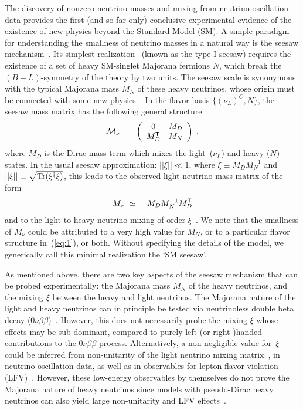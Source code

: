 \documentclass[reprint,prl,twocolumn,superscriptaddress,showpacs,nofootinbib,floatfix,preprintnumbers]{revtex4-1}
\newcommand{\col}{\textcolor{blue}}
\begin{document}
The discovery  of nonzero neutrino  masses and mixing  from neutrino
oscillation  data provides  the  first (and  so  far only)  conclusive
experimental  evidence of  the  existence of  new  physics beyond  the
Standard Model (SM). A simple paradigm for understanding the smallness
of   neutrino    masses   in   a    natural   way   is    the   seesaw
mechanism~\cite{review1}.    Its   simplest   realization~\cite{type1}
(known as the type-I seesaw) requires  the existence of a set of heavy
SM-singlet   Majorana  fermions   $N$,   which   break  the
$(B-L)$-symmetry  of the  theory by  two  units. The  seesaw scale  is
synonymous with  the typical Majorana mass  $M_N$ of these heavy 
neutrinos,    whose   origin    must    be   connected    with   some    new
physics~\cite{review1}. In the flavor basis $\{(\nu_{L})^C, N\}$, the
seesaw  mass   matrix  has  the   following  general
structure~\cite{type1, valle}:
\begin{eqnarray}
{\cal M}_\nu\ =\ 
\left(\begin{array}{cc}0 & M_D\\ M^{\sf T}_D & M_N\end{array}\right)\;, 
\label{eq1}
\end{eqnarray}
where $M_D$ is  the Dirac mass term which mixes  the light~($\nu_L$) and
heavy ($N$)  states. %
In
the usual  seesaw approximation: $||\xi  || \ll 1$, where  $\xi \equiv
M_D M^{-1}_N$  and $||\xi || \equiv  \sqrt{{\rm Tr} (\xi^\dagger \xi)}$,
this leads to the observed light neutrino mass matrix of the form
\begin{eqnarray}
  \label{eq:1}
M_\nu\ \simeq\ -M_D M_N^{-1} M_D^{\sf T}
\end{eqnarray}
and  to the light-to-heavy neutrino  mixing of  order $\xi$~\cite{valle}.
We note  that the smallness of  $M_\nu$ could be attributed  to a very
high  value   for  $M_N$,  or   to  a  particular   flavor  structure
in~(\ref{eq:1}),  or  both.  Without  specifying  the  details of  the
model, we  generically call this minimal realization the `SM
seesaw'.

As mentioned above, there are two key aspects of the
seesaw  mechanism  that can  be  probed  experimentally: the  Majorana
mass $M_N$  of  the heavy  neutrinos,  and  the mixing  $\xi$
between the  heavy and  light neutrinos.  The  Majorana nature  of the
light and heavy neutrinos can  in principle be tested via neutrinoless    
double          beta          decay
($0\nu\beta\beta$)~\cite{0v2breview}. 
However,    this   does   not
necessarily  probe the mixing $\xi$ whose 
effects may be sub-dominant, compared to 
purely   left-(or right-)handed contributions to   the
$0\nu\beta\beta$ process.   Alternatively, a non-negligible  
value for~$\xi$ could  be inferred from  non-unitarity of  the  light
neutrino mixing matrix~\cite{unitarity}, in neutrino oscillation data,
as well as in observables for lepton flavor violation (LFV)~\cite{lfv}.  
However,
these low-energy  observables by themselves do not  prove the Majorana
nature  of heavy  neutrinos since models with pseudo-Dirac heavy  
neutrinos can also yield large non-unitarity 
and LFV effects~\cite{invunitarity}.
\end{document}
